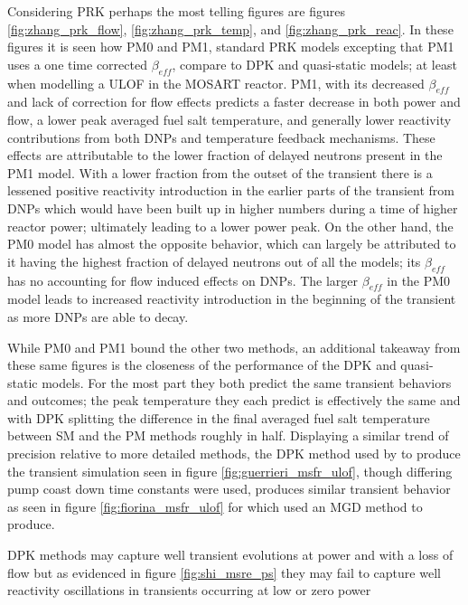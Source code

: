 \documentclass[review]{elsarticle}
\begin{document}
\par Considering PRK perhaps the most telling figures are figures
\ref{fig:zhang_prk_flow}, \ref{fig:zhang_prk_temp}, and 
\ref{fig:zhang_prk_reac}. In these figures it is seen how PM0 and PM1,
standard PRK models excepting that PM1 uses a one time corrected $\beta_{eff}$,
compare to DPK and quasi-static models; at least when modelling a ULOF in
the MOSART reactor. PM1, with its decreased $\beta_{eff}$ and lack of correction
for flow effects predicts a faster decrease in both power and flow, a lower
peak averaged fuel salt temperature, and generally lower reactivity
contributions from both DNPs and temperature feedback mechanisms. These
effects are attributable to the lower fraction of delayed neutrons present
in the PM1 model. With a lower fraction from the outset of the transient there
is a lessened positive reactivity introduction in the earlier parts of the
transient from DNPs which would have been built up in higher numbers during
a time of higher reactor power; ultimately leading to a lower power peak.
On the other hand, the PM0 model has almost
the opposite behavior, which can largely be attributed to it having the
highest fraction of delayed neutrons out of all the models; its $\beta_{eff}$
has no accounting for flow induced effects on DNPs. The larger
$\beta_{eff}$ in the PM0 model leads to increased reactivity introduction
in the beginning of the transient as more DNPs are able to decay.
\par While PM0 and PM1 bound the other two methods, an additional takeaway from
these same figures is the closeness of the performance of the DPK and
quasi-static models. For the most part they both predict the same transient
behaviors and outcomes; the peak temperature they each predict is effectively
the same and with DPK splitting the difference in the final averaged fuel salt
temperature between SM and the PM methods roughly in half. Displaying
a similar trend of precision relative to more detailed methods, the DPK method
 used by \cite{guerrieri_investigation_2013} to produce
the transient simulation seen in figure \ref{fig:guerrieri_msfr_ulof}, though
differing pump coast down time constants were used, produces similar transient
behavior as seen in figure \ref{fig:fiorina_msfr_ulof} for which
\cite{fiorina_modelling_2014} used an MGD method to produce.
\par DPK methods may capture well transient evolutions at power and with a loss
of flow but as evidenced in figure \ref{fig:shi_msre_ps} they may fail to
capture well reactivity oscillations in transients occurring at low or zero power
\end{document}
